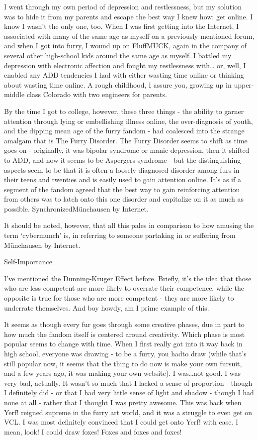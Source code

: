 I went through my own period of depression and restlessness, but my solution was to hide it from my parents and escape the best way I knew how: get online. I know I wasn't the only one, too. When I was first getting into the Internet, I associated with many of the same age as myself on a previously mentioned forum, and when I got into furry, I wound up on FluffMUCK, again in the company of several other high-school kids around the same age as myself. I battled my depression with electronic affection and fought my restlessness with\ldots{} or, well, I enabled any ADD tendencies I had with either wasting time online or thinking about wasting time online. A rough childhood, I assure you, growing up in upper-middle class Colorado with two engineers for parents.

By the time I got to college, however, these three things - the ability to garner attention through lying or embellishing illness online, the over-diagnosis of youth, and the dipping mean age of the furry fandom - had coalesced into the strange amalgam that is The Furry Disorder. The Furry Disorder seems to shift as time goes on - originally, it was bipolar syndrome or manic depression, then it shifted to ADD, and now it seems to be Aspergers syndrome - but the distinguishing aspects seem to be that it is often a loosely diagnosed disorder among furs in their teens and twenties and is easily used to gain attention online. It's as if a segment of the fandom agreed that the best way to gain reinforcing attention from others was to latch onto this one disorder and capitalize on it as much as possible. SynchronizedMünchausen by Internet.

It should be noted, however, that all this pales in comparison to how amusing the term `cybermunch' is, in referring to someone partaking in or suffering from Münchausen by Internet.

Self-Importance

I've mentioned the Dunning-Kruger Effect before. Briefly, it's the idea that those who are less competent are more likely to overrate their competence, while the opposite is true for those who are more competent - they are more likely to underrate themselves. And boy howdy, am I prime example of this.

It seems as though every fur goes through some creative phases, due in part to how much the fandom itself is centered around creativity. Which phase is most popular seems to change with time. When I first really got into it way back in high school, everyone was drawing - to be a furry, you hadto draw (while that's still popular now, it seems that the thing to do now is make your own fursuit, and a few years ago, it was making your own website). I was\ldots{}not good. I was very bad, actually. It wasn't so much that I lacked a sense of proportion - though I definitely did - or that I had very little sense of light and shadow - though I had none at all - rather that I thought I was pretty awesome. This was back when Yerf! reigned supreme in the furry art world, and it was a struggle to even get on VCL. I was most definitely convinced that I could get onto Yerf! with ease. I mean, look! I could draw foxes! Foxes and foxes and foxes!

